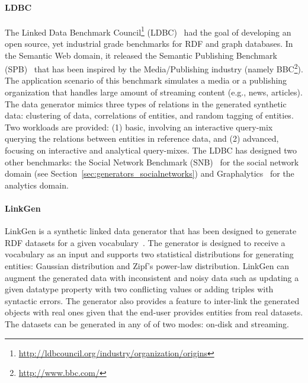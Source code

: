\paragraph{LDBC}  The Linked Data Benchmark Council\footnote{\url{http://ldbcouncil.org/industry/organization/origins}} (LDBC)~\cite{Angles:2014:LDB:2627692.2627697} %
had the goal of developing an open source, yet industrial grade benchmarks for RDF and graph databases. \iffalse The following three benchmarks were developed and are currently maintained.\fi In the Semantic Web domain, it released the Semantic Publishing Benchmark (SPB)~\cite{spb} that has been inspired by the Media/Publishing industry (namely BBC\footnote{\url{http://www.bbc.com/}}). The application scenario of this benchmark simulates a media or a publishing organization that handles large amount of streaming content (e.g., news, articles). \iffalse This content is enriched with metadata that describes it and links it to reference knowledge -- taxonomies and databases that include relevant concepts, entities and factual information. The SPB data generator produces scalable in size synthetic large data. Synthetic data consists of a large number of annotations of media assets that refer entities found in reference datasets.\fi The data generator mimics three types of relations in the generated synthetic data: clustering of data, correlations of entities, and random tagging of entities. Two workloads are provided: (1) basic, involving an interactive query-mix querying the relations between entities in reference data, and (2) advanced,  focusing on interactive and analytical query-mixes. The LDBC has designed two other benchmarks: the Social Network Benchmark (SNB)~\cite{Erling:2015:LSN:2723372.2742786} for the social network domain  (see Section~\ref{sec:generators_socialnetworks}) and Graphalytics~\cite{Iosup:2016:LGB:3007263.3007270}   for the analytics domain.%



\paragraph{LinkGen} LinkGen is a synthetic linked data generator that has been designed to generate RDF datasets for a given vocabulary~\cite{10.1007/978-3-319-46547-0_12}. The generator is designed to receive a vocabulary as an input  and supports two statistical distributions for generating entities: Gaussian distribution and Zipf's power-law distribution. LinkGen can augment the generated data with inconsistent and noisy  data such as updating a given datatype property with two conflicting values or  adding triples with syntactic errors. \iffalse, adding wrong statements by assigning them with invalid domain and creating instances with no type information.\fi The generator also provides a feature to inter-link the generated objects with real ones given that the end-user provides entities from real datasets. The datasets can be generated in any of of two modes: on-disk and streaming.

